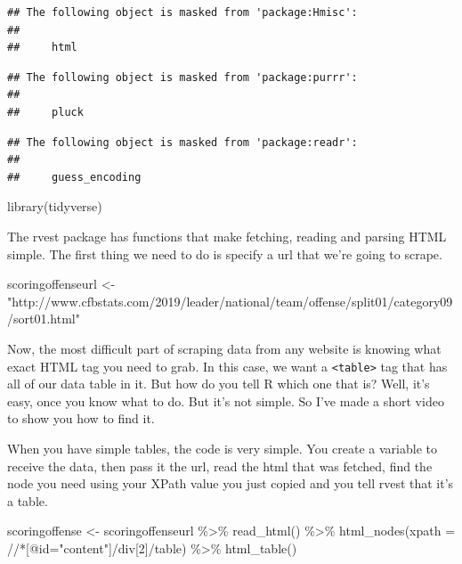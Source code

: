 \documentclass[
]{book}
\newenvironment{Shaded}{\begin{snugshade}}{\end{snugshade}}
\newcommand{\AttributeTok}[1]{\textcolor[rgb]{0.77,0.63,0.00}{#1}}
\newcommand{\FunctionTok}[1]{\textcolor[rgb]{0.00,0.00,0.00}{#1}}
\newcommand{\NormalTok}[1]{#1}
\newcommand{\OtherTok}[1]{\textcolor[rgb]{0.56,0.35,0.01}{#1}}
\newcommand{\SpecialCharTok}[1]{\textcolor[rgb]{0.00,0.00,0.00}{#1}}
\newcommand{\StringTok}[1]{\textcolor[rgb]{0.31,0.60,0.02}{#1}}
\begin{document}
\begin{verbatim}
## The following object is masked from 'package:Hmisc':
## 
##     html
\end{verbatim}

\begin{verbatim}
## The following object is masked from 'package:purrr':
## 
##     pluck
\end{verbatim}

\begin{verbatim}
## The following object is masked from 'package:readr':
## 
##     guess_encoding
\end{verbatim}

\begin{Shaded}
\begin{Highlighting}[]
\FunctionTok{library}\NormalTok{(tidyverse)}
\end{Highlighting}
\end{Shaded}

The rvest package has functions that make fetching, reading and parsing HTML simple. The first thing we need to do is specify a url that we're going to scrape.

\begin{Shaded}
\begin{Highlighting}[]
\NormalTok{scoringoffenseurl }\OtherTok{\textless{}{-}} \StringTok{"http://www.cfbstats.com/2019/leader/national/team/offense/split01/category09/sort01.html"}
\end{Highlighting}
\end{Shaded}

Now, the most difficult part of scraping data from any website is knowing what exact HTML tag you need to grab. In this case, we want a \texttt{\textless{}table\textgreater{}} tag that has all of our data table in it. But how do you tell R which one that is? Well, it's easy, once you know what to do. But it's not simple. So I've made a short video to show you how to find it.

When you have simple tables, the code is very simple. You create a variable to receive the data, then pass it the url, read the html that was fetched, find the node you need using your XPath value you just copied and you tell rvest that it's a table.

\begin{Shaded}
\begin{Highlighting}[]
\NormalTok{scoringoffense }\OtherTok{\textless{}{-}}\NormalTok{ scoringoffenseurl }\SpecialCharTok{\%\textgreater{}\%}
  \FunctionTok{read\_html}\NormalTok{() }\SpecialCharTok{\%\textgreater{}\%}
  \FunctionTok{html\_nodes}\NormalTok{(}\AttributeTok{xpath =} \StringTok{\textquotesingle{}//*[@id="content"]/div[2]/table\textquotesingle{}}\NormalTok{) }\SpecialCharTok{\%\textgreater{}\%}
  \FunctionTok{html\_table}\NormalTok{()}
\end{Highlighting}
\end{Shaded}
\end{document}
